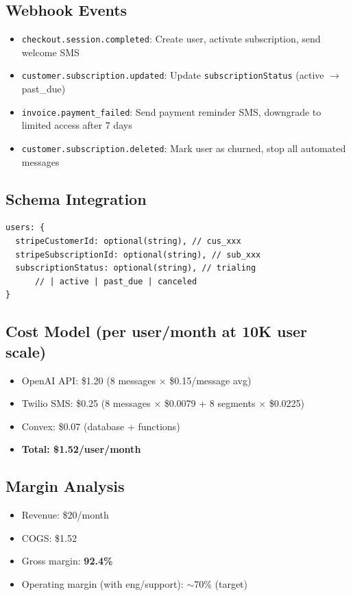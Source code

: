 \documentclass{article}%
\begin{document}
\subsection*{Webhook Events}
\begin{itemize}
    \item \texttt{checkout.session.completed}: Create user, activate subscription, send welcome SMS
    \item \texttt{customer.subscription.updated}: Update \texttt{subscriptionStatus} (active $\rightarrow$ past\_due)
    \item \texttt{invoice.payment\_failed}: Send payment reminder SMS, downgrade to limited access after 7 days
    \item \texttt{customer.subscription.deleted}: Mark user as churned, stop all automated messages
\end{itemize}

\subsection*{Schema Integration}
\begin{verbatim}
users: {
  stripeCustomerId: optional(string), // cus_xxx
  stripeSubscriptionId: optional(string), // sub_xxx
  subscriptionStatus: optional(string), // trialing
      // | active | past_due | canceled
}
\end{verbatim}

\subsection*{Cost Model (per user/month at 10K user scale)}
\begin{itemize}
    \item OpenAI API: \$1.20 (8 messages $\times$ \$0.15/message avg)
    \item Twilio SMS: \$0.25 (8 messages $\times$ \$0.0079 + 8 segments $\times$ \$0.0225)
    \item Convex: \$0.07 (database + functions)
    \item \textbf{Total: \$1.52/user/month}
\end{itemize}

\subsection*{Margin Analysis}
\begin{itemize}
    \item Revenue: \$20/month
    \item COGS: \$1.52
    \item Gross margin: \textbf{92.4\%}
    \item Operating margin (with eng/support): $\sim$70\% (target)
\end{itemize}
\end{document}
